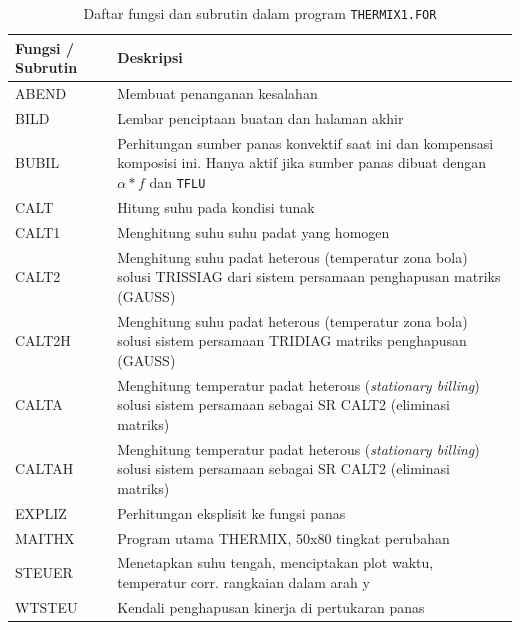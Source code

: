 \documentclass[a4paper,11pt]{report}
\begin{document}
\begin{table}[h!]
  \caption{Daftar fungsi dan subrutin dalam program \texttt{THERMIX1.FOR}}
  \label{tab:the1}

  \begin{center}
    \begin{tabular}{p{3cm}|p{10cm}}
    \toprule
       Fungsi / Subrutin & Deskripsi\\ \midrule
       ABEND & Membuat penanganan kesalahan \\
       BILD & Lembar penciptaan buatan dan halaman akhir \\
       BUBIL & Perhitungan sumber panas konvektif saat ini dan kompensasi komposisi ini. Hanya aktif jika sumber panas dibuat dengan $\alpha * f$ dan \texttt{TFLU} \\
       CALT & Hitung suhu pada kondisi tunak \\
       CALT1 & Menghitung suhu suhu padat yang homogen \\
       CALT2 & Menghitung suhu padat heterous (temperatur zona bola) solusi TRISSIAG dari sistem persamaan penghapusan matriks (GAUSS) \\
       CALT2H & Menghitung suhu padat heterous (temperatur zona bola) solusi sistem persamaan TRIDIAG matriks penghapusan (GAUSS) \\
       CALTA & Menghitung temperatur padat heterous (\textit{stationary billing}) solusi sistem persamaan sebagai SR CALT2 (eliminasi matriks) \\
       CALTAH & Menghitung temperatur padat heterous (\textit{stationary billing}) solusi sistem persamaan sebagai SR CALT2 (eliminasi matriks) \\
       EXPLIZ & Perhitungan eksplisit ke fungsi panas \\
       MAITHX & Program utama THERMIX, 50x80 tingkat perubahan \\
       STEUER & Menetapkan suhu tengah, menciptakan plot waktu, temperatur corr. rangkaian dalam arah y \\ 
       WTSTEU & Kendali penghapusan kinerja di pertukaran panas \\
       \bottomrule
    \end{tabular}
  \end{center}
\end{table}
\end{document}
